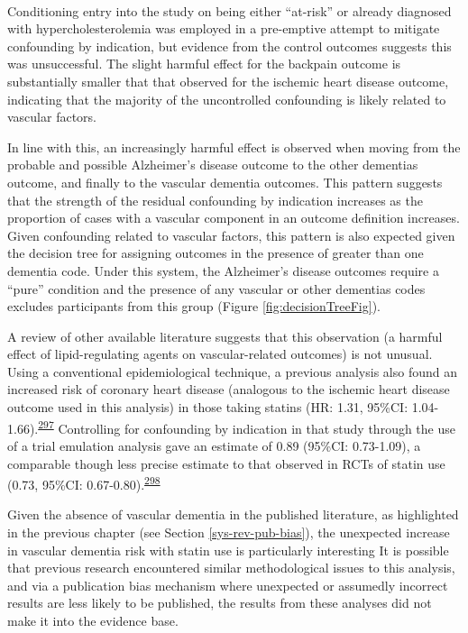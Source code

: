 \documentclass[a4paper, twoside]{templates/ociamthesis}
\begin{document}
~

Conditioning entry into the study on being either ``at-risk'' or already diagnosed with hypercholesterolemia was employed in a pre-emptive attempt to mitigate confounding by indication, but evidence from the control outcomes suggests this was unsuccessful. The slight harmful effect for the backpain outcome is substantially smaller that that observed for the ischemic heart disease outcome, indicating that the majority of the uncontrolled confounding is likely related to vascular factors.

In line with this, an increasingly harmful effect is observed when moving from the probable and possible Alzheimer's disease outcome to the other dementias outcome, and finally to the vascular dementia outcomes. This pattern suggests that the strength of the residual confounding by indication increases as the proportion of cases with a vascular component in an outcome definition increases. Given confounding related to vascular factors, this pattern is also expected given the decision tree for assigning outcomes in the presence of greater than one dementia code. Under this system, the Alzheimer's disease outcomes require a ``pure'' condition and the presence of any vascular or other dementias codes excludes participants from this group (Figure \ref{fig:decisionTreeFig}).

A review of other available literature suggests that this observation (a harmful effect of lipid-regulating agents on vascular-related outcomes) is not unusual. Using a conventional epidemiological technique, a previous analysis also found an increased risk of coronary heart disease (analogous to the ischemic heart disease outcome used in this analysis) in those taking statins (HR: 1.31, 95\%CI: 1.04-1.66).\textsuperscript{\protect\hyperlink{ref-danaei2013b}{297}} Controlling for confounding by indication in that study through the use of a trial emulation analysis gave an estimate of 0.89 (95\%CI: 0.73-1.09), a comparable though less precise estimate to that observed in RCTs of statin use (0.73, 95\%CI: 0.67-0.80).\textsuperscript{\protect\hyperlink{ref-taylor2013}{298}}

Given the absence of vascular dementia in the published literature, as highlighted in the previous chapter (see Section \ref{sys-rev-pub-bias}), the unexpected increase in vascular dementia risk with statin use is particularly interesting It is possible that previous research encountered similar methodological issues to this analysis, and via a publication bias mechanism where unexpected or assumedly incorrect results are less likely to be published, the results from these analyses did not make it into the evidence base.
\end{document}
